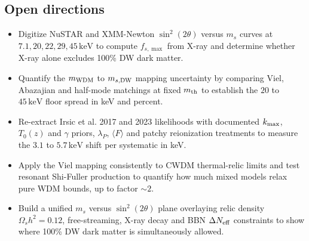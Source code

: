 \documentclass[11pt,a4paper]{article}
\begin{document}
\subsection{Open directions}
\begin{itemize}
  \item Digitize NuSTAR and XMM-Newton $\sin^2(2\theta)$ versus $m_s$ curves at $7.1, 20, 22, 29, 45\,\mathrm{keV}$ to compute $f_{s,\max}$ from X-ray and determine whether X-ray alone excludes 100\% DW dark matter.
  \item Quantify the $m_{\rm WDM}$ to $m_{s,{\rm DW}}$ mapping uncertainty by comparing Viel, Abazajian and half-mode matchings at fixed $m_{\rm th}$ to establish the $20$ to $45\,\mathrm{keV}$ floor spread in keV and percent.
  \item Re-extract Irsic et al. 2017 and 2023 likelihoods with documented $k_{\rm max}$, $T_0(z)$ and $\gamma$ priors, $\lambda_P$, $\langle F \rangle$ and patchy reionization treatments to measure the $3.1$ to $5.7\,\mathrm{keV}$ shift per systematic in keV.
  \item Apply the Viel mapping consistently to CWDM thermal-relic limits and test resonant Shi-Fuller production to quantify how much mixed models relax pure WDM bounds, up to factor $\sim 2$.
  \item Build a unified $m_s$ versus $\sin^2(2\theta)$ plane overlaying relic density $\Omega_s h^2 = 0.12$, free-streaming, X-ray decay and BBN $\Delta N_{\rm eff}$ constraints to show where 100\% DW dark matter is simultaneously allowed.
\end{itemize}
\end{document}
